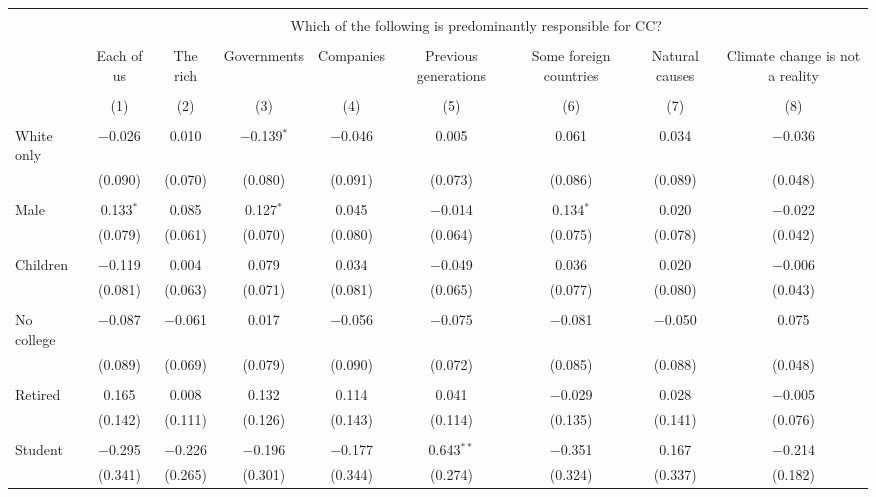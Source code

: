 
\begin{tabular}{@{\extracolsep{5pt}}lcccccccc} 
\\[-1.8ex]\hline 
\hline \\[-1.8ex] 
 & \multicolumn{8}{c}{Which of the following is predominantly responsible for CC?} \\ 
\cline{2-9} 
\\[-1.8ex] & Each of us & The rich & Governments & Companies & Previous generations & Some foreign countries & Natural causes & Climate change is not a reality \\ 
\\[-1.8ex] & (1) & (2) & (3) & (4) & (5) & (6) & (7) & (8)\\ 
\hline \\[-1.8ex] 
 White only & $-$0.026 & 0.010 & $-$0.139$^{*}$ & $-$0.046 & 0.005 & 0.061 & 0.034 & $-$0.036 \\ 
  & (0.090) & (0.070) & (0.080) & (0.091) & (0.073) & (0.086) & (0.089) & (0.048) \\ 
  & & & & & & & & \\ 
 Male & 0.133$^{*}$ & 0.085 & 0.127$^{*}$ & 0.045 & $-$0.014 & 0.134$^{*}$ & 0.020 & $-$0.022 \\ 
  & (0.079) & (0.061) & (0.070) & (0.080) & (0.064) & (0.075) & (0.078) & (0.042) \\ 
  & & & & & & & & \\ 
 Children & $-$0.119 & 0.004 & 0.079 & 0.034 & $-$0.049 & 0.036 & 0.020 & $-$0.006 \\ 
  & (0.081) & (0.063) & (0.071) & (0.081) & (0.065) & (0.077) & (0.080) & (0.043) \\ 
  & & & & & & & & \\ 
 No college & $-$0.087 & $-$0.061 & 0.017 & $-$0.056 & $-$0.075 & $-$0.081 & $-$0.050 & 0.075 \\ 
  & (0.089) & (0.069) & (0.079) & (0.090) & (0.072) & (0.085) & (0.088) & (0.048) \\ 
  & & & & & & & & \\ 
 Retired & 0.165 & 0.008 & 0.132 & 0.114 & 0.041 & $-$0.029 & 0.028 & $-$0.005 \\ 
  & (0.142) & (0.111) & (0.126) & (0.143) & (0.114) & (0.135) & (0.141) & (0.076) \\ 
  & & & & & & & & \\ 
 Student & $-$0.295 & $-$0.226 & $-$0.196 & $-$0.177 & 0.643$^{**}$ & $-$0.351 & 0.167 & $-$0.214 \\ 
  & (0.341) & (0.265) & (0.301) & (0.344) & (0.274) & (0.324) & (0.337) & (0.182) \\ 

\end{tabular}
